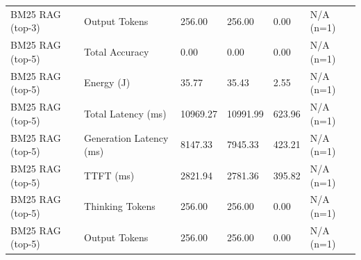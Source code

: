 \begin{table}
\begin{tabular}{llllll}
BM25 RAG (top-3) & Output Tokens & 256.00 & 256.00 & 0.00 & N/A (n=1) \\
BM25 RAG (top-5) & Total Accuracy & 0.00 & 0.00 & 0.00 & N/A (n=1) \\
BM25 RAG (top-5) & Energy (J) & 35.77 & 35.43 & 2.55 & N/A (n=1) \\
BM25 RAG (top-5) & Total Latency (ms) & 10969.27 & 10991.99 & 623.96 & N/A (n=1) \\
BM25 RAG (top-5) & Generation Latency (ms) & 8147.33 & 7945.33 & 423.21 & N/A (n=1) \\
BM25 RAG (top-5) & TTFT (ms) & 2821.94 & 2781.36 & 395.82 & N/A (n=1) \\
BM25 RAG (top-5) & Thinking Tokens & 256.00 & 256.00 & 0.00 & N/A (n=1) \\
BM25 RAG (top-5) & Output Tokens & 256.00 & 256.00 & 0.00 & N/A (n=1) \\
\bottomrule
\end{tabular}
\end{table}
